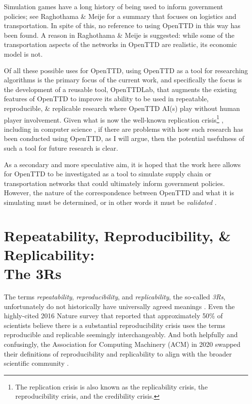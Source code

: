 \documentclass[logo,msc,dsti]{style/infthesis}    %
\newcommand{\singlespacedfootnote}[1]{{\singlespace\footnote{#1}}}
\begin{document}
Simulation games have a long history of being used to inform government policies; see Raghothama \& Meije \cite{raghothama2013review} for a summary that focuses on logistics and transportation. In spite of this, no reference to using OpenTTD in this way has been found. A reason in Raghothama \& Meije \cite{raghothama2013review} is suggested: while some of the transportation aspects of the networks in OpenTTD are realistic, its economic model is not.

Of all these possible uses for OpenTTD, using OpenTTD as a tool for researching algorithms is the primary focus of the current work, and specifically the focus is the development of a reusable tool, OpenTTDLab, that augments the existing features of OpenTTD to improve its ability to be used in repeatable, reproducible, \& replicable research where OpenTTD AI(s) play without human player involvement. Given what is now the well-known replication crisis\singlespacedfootnote{The replication crisis is also known as the replicability crisis, the reproducibility crisis, and the credibility crisis.} \cite{ioannidis2005most, baker20161}, including in computer science \cite{dalle2012reproducibility, CollbergChristianProebsting2016}, if there are problems with how such research has been conducted using OpenTTD, as I will argue, then the potential usefulness of such a tool for future research is clear.

As a secondary and more speculative aim, it is hoped that the work here allows for OpenTTD to be investigated as a tool to simulate supply chain or transportation networks that could ultimately inform government policies. However, the nature of the correspondence between OpenTTD and what it is simulating must be determined, or in other words it must be \emph{validated} \cite{doi:10.1177/1046878198291003}.

\section[Repeatability, Reproducibility, \& Replicability: The 3Rs]{Repeatability, Reproducibility, \& Replicability:\texorpdfstring{\\}{ }The 3Rs}
\label{section:define-3rs}

The terms \emph{repeatability}, \emph{reproducibility}, and \emph{replicability}, the so-called \emph{3Rs}, unfortunately do not historically have universally agreed meanings \cite{plesser_reproducibility_2018}. Even the highly-cited 2016 Nature survey that reported that approximately 50\% of scientists believe there is a substantial reproducibility crisis \cite{baker20161}  uses the terms reproducible and replicable seemingly interchangeably. And both helpfully and confusingly, the Association for Computing Machinery (ACM) in 2020 swapped their definitions of reproducibility and replicability to align with the broader scientific community \cite{association_for_computing_machiner_new_2020}.
\end{document}
